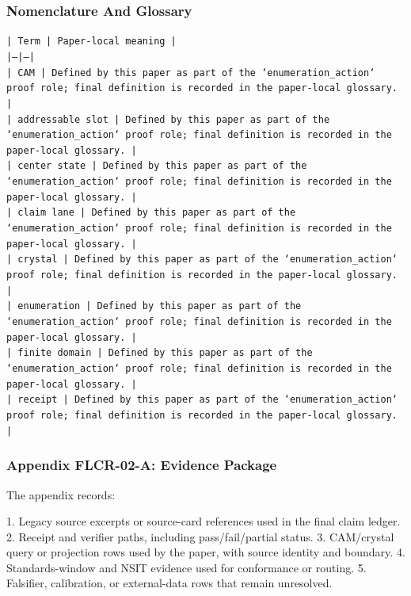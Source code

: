 \documentclass[11pt]{article}
\begin{document}
\subsubsection*{Nomenclature And Glossary}

\noindent\texttt{| Term | Paper-local meaning |}\\
\noindent\texttt{|---|---|}\\
\noindent\texttt{| CAM | Defined by this paper as part of the `enumeration\_action` proof role; final definition is recorded in the paper-local glossary. |}\\
\noindent\texttt{| addressable slot | Defined by this paper as part of the `enumeration\_action` proof role; final definition is recorded in the paper-local glossary. |}\\
\noindent\texttt{| center state | Defined by this paper as part of the `enumeration\_action` proof role; final definition is recorded in the paper-local glossary. |}\\
\noindent\texttt{| claim lane | Defined by this paper as part of the `enumeration\_action` proof role; final definition is recorded in the paper-local glossary. |}\\
\noindent\texttt{| crystal | Defined by this paper as part of the `enumeration\_action` proof role; final definition is recorded in the paper-local glossary. |}\\
\noindent\texttt{| enumeration | Defined by this paper as part of the `enumeration\_action` proof role; final definition is recorded in the paper-local glossary. |}\\
\noindent\texttt{| finite domain | Defined by this paper as part of the `enumeration\_action` proof role; final definition is recorded in the paper-local glossary. |}\\
\noindent\texttt{| receipt | Defined by this paper as part of the `enumeration\_action` proof role; final definition is recorded in the paper-local glossary. |}\\

\subsubsection*{Appendix FLCR-02-A: Evidence Package}

The appendix records:

1. Legacy source excerpts or source-card references used in the final claim ledger.
2. Receipt and verifier paths, including pass/fail/partial status.
3. CAM/crystal query or projection rows used by the paper, with source identity and boundary.
4. Standards-window and NSIT evidence used for conformance or routing.
5. Falsifier, calibration, or external-data rows that remain unresolved.
\end{document}
